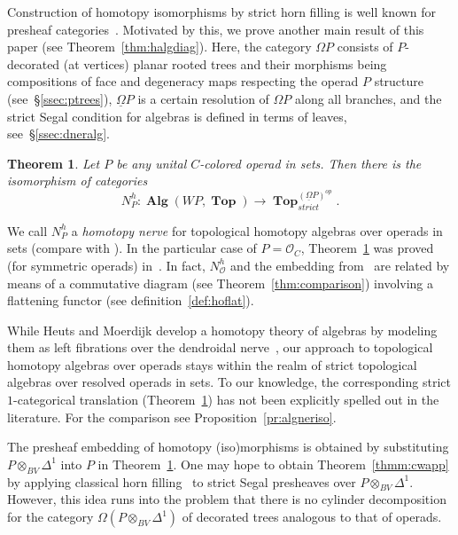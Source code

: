 \documentclass{amsart}
\newcounter{thmMaincounter}
\newtheorem{theoremM}[thmMaincounter]{Theorem}
\theoremstyle{definition}
\theoremstyle{remark}
\DeclareMathOperator{\Top}{\mathbf{Top}}
\DeclareMathOperator{\Alg}{\mathbf{Alg}}
\begin{document}
	Construction of homotopy isomorphisms by strict horn filling is well known for presheaf categories~\cite{co-po-86}.
	Motivated by this, we prove another main result of this paper (see Theorem~\ref{thm:halgdiag}).
	Here, the category $\Omega P$ consists of $P$-decorated (at vertices) planar rooted trees and their morphisms being compositions of face and degeneracy maps respecting the operad $P$ structure (see~\S\ref{ssec:ptrees}), $\underline{\Omega} P$ is a certain resolution of $\Omega P$ along all branches,
	and the strict Segal condition for algebras is defined in terms of leaves, see~\S\ref{ssec:dneralg}.

	\begin{theoremM}\label{thmm:preshemb}
		Let $P$ be any unital $C$-colored operad in sets.
		Then there is the isomorphism of categories
		\[
			N_{P}^{h}\colon	\Alg(WP,\Top)\to \Top^{(\underline{\Omega} P)^{op}}_{strict}.
		\]
	\end{theoremM}
	
	We call $N_{P}^{h}$ a \textit{homotopy nerve} for topological homotopy algebras over operads in sets (compare with \cite[\S13]{he-mo-22}).
	In the particular case of $P=\mathcal{O}_{C}$, Theorem~\ref{thmm:preshemb} was proved (for symmetric operads) in~\cite[Theorem~B.6]{clrrw-22}.
	In fact, $N_{\mathcal{O}}^{h}$ and the embedding from~\cite[Theorem B.6]{clrrw-22} are related by means of a commutative diagram (see Theorem~\ref{thm:comparison}) involving a flattening functor (see definition~\ref{def:hoflat}).
	
	While Heuts and Moerdijk develop a homotopy theory of algebras by modeling them as left fibrations over the dendroidal nerve~\cite{he-mo-22}, our approach to topological homotopy algebras over operads stays within the realm of strict topological algebras over resolved operads in sets. 
	To our knowledge, the corresponding strict $1$-categorical translation (Theorem~\ref{thmm:preshemb}) has not been explicitly spelled out in the literature.
	For the comparison see Proposition~\ref{pr:algneriso}. 
	
	The presheaf embedding of homotopy (iso)morphisms is obtained by substituting $P\otimes_{BV}\Delta^{1}$ into $P$ in Theorem~\ref{thmm:preshemb}.
	One may hope to obtain Theorem~\ref{thmm:cwapp} by applying classical horn filling~\cite{co-po-86} to strict Segal presheaves over $P\otimes_{BV}\Delta^{1}$.
	However, this idea runs into the problem that there is no cylinder decomposition for the category $\Omega (P\otimes_{BV} \Delta^{1})$ of decorated trees analogous to that of operads.
	
\end{document}

